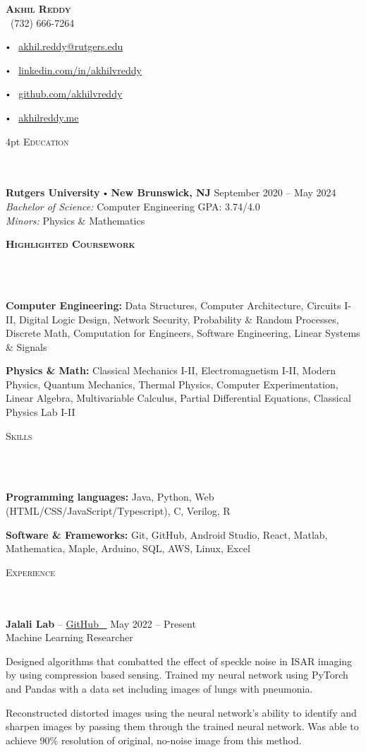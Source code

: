 \documentclass{article}
\newcommand{\contact}[3]{
\vspace*{3pt}
\begin{center}
{\LARGE \scshape {#1}}\\
\vspace{5pt}
#2 
\vspace{2pt}
#3
\end{center}
\vspace*{-8pt}
}
\newcommand{\header}[1]{{
\hspace*{0pt}\vspace*{6pt} \textsc{#1}} \vspace*{-6pt} 
\lineunder
}
\newcommand{\lineunder}{
\vspace*{-8pt} \\ \hspace*{-3pt} 
\hrulefill \\
}
\newcommand{\college}[7]{
\textbf{#1} \labelitemi \textbf{#2} \hfill #3 \\ #4 \hfill #7 \\ #5 \\ #6 \vspace*{5pt}
}
\newcommand{\employer}[4]{{
\vspace*{2pt}%
\textbf{#1} #2 \hfill #3\\ #4 \vspace*{2pt}}
}
\renewcommand{\labelitemi}{
$\vcenter{\hbox{\tiny$\bullet$}}$\hspace*{3pt}
}
\renewcommand{\labelitemii}{
$\vcenter{\hbox{\tiny$\bullet$}}$\hspace*{-3pt}
}
\newenvironment{bullet-list-major}{
\begin{list}{\labelitemii}{\setlength\leftmargin{9pt} 
\topsep 0pt \itemsep -2pt}}{\vspace*{4pt}\end{list}
}
\newenvironment{bullet-list-minor}{
\begin{list}{\labelitemii}{\setlength\leftmargin{15pt} 
\topsep 0pt \itemsep -2pt}}{\vspace*{4pt}\end{list}
}
\begin{document}
\small
\smallskip
\vspace*{-44pt}

\contact{\textbf{Akhil Reddy}}
{\faPhone\ (732) 666-7264
\labelitemi \faEnvelope\ \href{mailto:avr54@scarletmail.rutgers.edu}{akhil.reddy@rutgers.edu}
\labelitemi \faLinkedin\ \href{https://www.linkedin.com/in/akhilvreddy/}{linkedin.com/in/akhilvreddy}
\labelitemi \faGithub\ \href{https://github.com/akhilvreddy}{github.com/akhilvreddy}%
\labelitemi \faLink\ \href{https://akhilvreddy.github.io}{akhilreddy.me}

}

\vspace{4pt}
\header{Education}
    \college{Rutgers University}{New Brunswick, NJ}{September 2020 -- May 2024}
    {\textit{Bachelor of Science:}  Computer Engineering}
    {\textit{Minors:} Physics \& Mathematics}{} 
    {GPA: 3.74/4.0}

    
\vspace*{4pt}%
\header{\textbf{Highlighted Coursework}}
    \begin{bullet-list-major}
    \item \textbf{Computer Engineering:} Data Structures, Computer Architecture, Circuits I-II, Digital Logic Design, Network Security, Probability \& Random Processes, Discrete Math, Computation for Engineers, Software Engineering, Linear Systems \& Signals
    \item \textbf{Physics \& Math:} Classical Mechanics I-II, Electromagnetism I-II, Modern Physics, Quantum Mechanics, Thermal Physics, Computer Experimentation, Linear Algebra, Multivariable Calculus, Partial Differential Equations, Classical Physics Lab I-II
    \end{bullet-list-major}

\vspace*{4pt}%
\header{Skills}
    \begin{bullet-list-major}
    \item \textbf{Programming languages:} Java, Python, Web (HTML/CSS/JavaScript/Typescript), C, Verilog, R
    \item \textbf{Software \& Frameworks:} Git, GitHub, Android Studio, React, Matlab, Mathematica, Maple, Arduino, SQL, AWS, Linux, Excel
    
    \end{bullet-list-major}
    
\vspace*{4pt}%
\header{Experience}
    \employer{Jalali Lab}
    { -- \href{https://github.com/akhilvreddy/Autoencoder}{GitHub \faGithub\ }}{May 2022 -- Present}{Machine Learning Researcher}
    \begin{bullet-list-minor}
	\item Designed algorithms that combatted the effect of speckle noise in ISAR imaging by using compression based sensing. Trained my neural network using PyTorch and Pandas with a data set including images of lungs with pneumonia.
	\item Reconstructed distorted images using the neural network's ability to identify and sharpen images by passing them through the trained neural network. Was able to achieve 90\% resolution of original, no-noise image from this method.  
    \end{bullet-list-minor}
\end{document}
